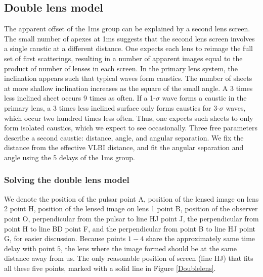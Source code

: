 \documentclass[useAMS,usenatbib]{mn2e}
\begin{document}
\subsection{Double lens model}
\label{doublelensmodel}

The apparent offset of the 1ms group can be explained by a second lens
screen.  The small number of apexes at 1ms suggests that the second
lens screen involves a single caustic at a different distance.  One
expects each lens to reimage the full set of first scatterings,
resulting in a number of apparent images equal to the product of
number of lenses in each screen.
In the
primary lens system, the inclination appears such that typical waves
form caustics.  The number of sheets at more shallow inclination
increases as the square of the small angle.  A 3 times less inclined
sheet occurs 9 times as often.  If a 1-$\sigma$ wave forms a caustic
in the primary lens, a 3 times less inclined surface only forms
caustics for 3-$\sigma$ waves, which occur two hundred times less
often.  Thus, one expects such sheets to only form isolated caustics,
which we expect to see occasionally.  Three free parameters describe a
second caustic: distance, angle, and angular separation.  We fix the
distance from the effective VLBI distance, and fit the angular
separation and angle using the 5 delays of the 1ms group.

\subsubsection{Solving the double lens model}
We denote the position of the pulsar point A, position of the lensed image on lens 2 point H, position of the lensed image on lens 1 point B, position of the observer point O, perpendicular from the pulsar to line HJ point J, the perpendicular from point H to line BD point F, and the perpendicular from point B to line HJ point G, for easier discussion.
Because points $1-4$ share the approximately same time delay with point $5$, the lens where the image formed should be at the same distance away from us. The only reasonable position of screen (line HJ) that fits all these five points, marked with a solid line in Figure \ref{Doublelens}.  
\end{document}
